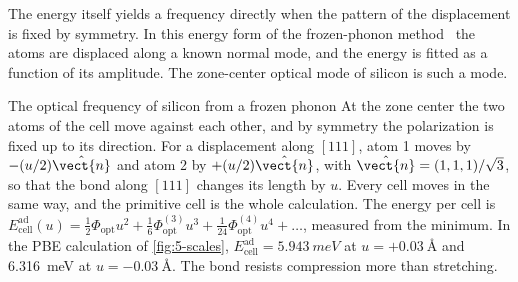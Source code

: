 The energy itself yields a frequency directly when the pattern of the displacement is fixed by symmetry. In this energy form of the frozen-phonon method~\cite[Sect.~IV.B]{baroni2001phonons} the atoms are displaced along a known normal mode, and the energy is fitted as a function of its amplitude. The zone-center optical mode of silicon is such a mode.

\begin{workedexample}{The optical frequency of silicon from a frozen phonon}\label{we:5-frozen}
At the zone center the two atoms of the cell move against each other, and by symmetry the polarization is fixed up to its direction. For a displacement along $[111]$, atom 1 moves by $-(u/2)\hat{\vect{n}}$ and atom 2 by $+(u/2)\hat{\vect{n}}$, with $\hat{\vect{n}} = (1,1,1)/\sqrt3$, so that the bond along $[111]$ changes its length by $u$. Every cell moves in the same way, and the primitive cell is the whole calculation. The energy per cell is $E^{\mathrm{ad}}_{\mathrm{cell}}(u) = \tfrac12\Phi_{\mathrm{opt}}u^2 + \tfrac16\Phi^{(3)}_{\mathrm{opt}}u^3 + \tfrac1{24}\Phi^{(4)}_{\mathrm{opt}}u^4 + \dots$, measured from the minimum. In the PBE calculation of \cref{fig:5-scales}, $E^{\mathrm{ad}}_{\mathrm{cell}} = \SI{5.943}{meV}$ at $u = +\SI{0.03}{\angstrom}$ and \SI{6.316}{meV} at $u = -\SI{0.03}{\angstrom}$. The bond resists compression more than stretching.


\end{workedexample}
